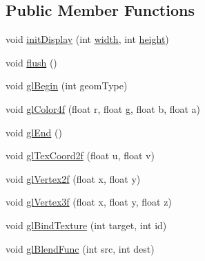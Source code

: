 \subsection*{Public Member Functions}
\begin{DoxyCompactItemize}
\item 
void \mbox{\hyperlink{classorg_1_1newdawn_1_1slick_1_1opengl_1_1renderer_1_1_v_a_o_g_l_renderer_a3fbd9ed92506387ab043ab5ddd8e6327}{init\+Display}} (int \mbox{\hyperlink{classorg_1_1newdawn_1_1slick_1_1opengl_1_1renderer_1_1_immediate_mode_o_g_l_renderer_a65d0a04d747368ea954f69074d9102d6}{width}}, int \mbox{\hyperlink{classorg_1_1newdawn_1_1slick_1_1opengl_1_1renderer_1_1_immediate_mode_o_g_l_renderer_aec68994a0ee3b7b478122af823c8a8d7}{height}})
\item 
void \mbox{\hyperlink{classorg_1_1newdawn_1_1slick_1_1opengl_1_1renderer_1_1_v_a_o_g_l_renderer_aac1c130db1e7fbe52a5beb3a4f9f3186}{flush}} ()
\item 
void \mbox{\hyperlink{classorg_1_1newdawn_1_1slick_1_1opengl_1_1renderer_1_1_v_a_o_g_l_renderer_ad75148fef06b01d129847e657f19a561}{gl\+Begin}} (int geom\+Type)
\item 
void \mbox{\hyperlink{classorg_1_1newdawn_1_1slick_1_1opengl_1_1renderer_1_1_v_a_o_g_l_renderer_a9ab7945987d3cd40a9eff2d4506af44e}{gl\+Color4f}} (float r, float g, float b, float a)
\item 
void \mbox{\hyperlink{classorg_1_1newdawn_1_1slick_1_1opengl_1_1renderer_1_1_v_a_o_g_l_renderer_aa652d16e703985c4415f750d7e4483d5}{gl\+End}} ()
\item 
void \mbox{\hyperlink{classorg_1_1newdawn_1_1slick_1_1opengl_1_1renderer_1_1_v_a_o_g_l_renderer_af0cb344d4b0374c1f6ee17dd37ecfc15}{gl\+Tex\+Coord2f}} (float u, float v)
\item 
void \mbox{\hyperlink{classorg_1_1newdawn_1_1slick_1_1opengl_1_1renderer_1_1_v_a_o_g_l_renderer_a2d875eda69e18a467a6e17f4e7cfaa17}{gl\+Vertex2f}} (float x, float y)
\item 
void \mbox{\hyperlink{classorg_1_1newdawn_1_1slick_1_1opengl_1_1renderer_1_1_v_a_o_g_l_renderer_a4ca20d3414cf85fb5b4daf4a5de39685}{gl\+Vertex3f}} (float x, float y, float z)
\item 
void \mbox{\hyperlink{classorg_1_1newdawn_1_1slick_1_1opengl_1_1renderer_1_1_v_a_o_g_l_renderer_a1a3ed406d01bd2ed60c35145d0539805}{gl\+Bind\+Texture}} (int target, int id)
\item 
void \mbox{\hyperlink{classorg_1_1newdawn_1_1slick_1_1opengl_1_1renderer_1_1_v_a_o_g_l_renderer_a97ff78c9e3edba2affe402b59e18d848}{gl\+Blend\+Func}} (int src, int dest)

\end{DoxyCompactItemize}
